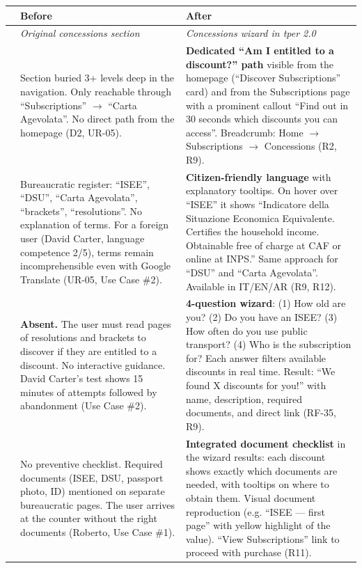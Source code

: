 \begin{table}[H]
\centering
\small
\renewcommand{\arraystretch}{1.4}
\begin{tabular}{|p{0.5cm}|p{7cm}|p{7cm}|}
\hline
& \textbf{Before} & \textbf{After} \\ \hline
\cellcolor{primaryColor!15} &
\textit{Original concessions section} &
\textit{Concessions wizard in tper 2.0} \\ \hline

\raisebox{0.5cm}{\rotatebox{90}{\textbf{Access}}} &
Section buried 3+ levels deep in the navigation. Only reachable through ``Subscriptions'' $\rightarrow$ ``Carta Agevolata''. No direct path from the homepage (D2, UR-05). &
\textbf{Dedicated ``Am I entitled to a discount?'' path} visible from the homepage (``Discover Subscriptions'' card) and from the Subscriptions page with a prominent callout ``Find out in 30 seconds which discounts you can access''. Breadcrumb: Home $\rightarrow$ Subscriptions $\rightarrow$ Concessions (R2, R9). \\ \hline

\raisebox{0.5cm}{\rotatebox{90}{\textbf{Language}}} &
Bureaucratic register: ``ISEE'', ``DSU'', ``Carta Agevolata'', ``brackets'', ``resolutions''. No explanation of terms. For a foreign user (David Carter, language competence 2/5), terms remain incomprehensible even with Google Translate (UR-05, Use Case \#2). &
\textbf{Citizen-friendly language} with explanatory tooltips. On hover over ``ISEE'' it shows ``Indicatore della Situazione Economica Equivalente. Certifies the household income. Obtainable free of charge at CAF or online at INPS.'' Same approach for ``DSU'' and ``Carta Agevolata''. Available in IT/EN/AR (R9, R12). \\ \hline

\raisebox{0.5cm}{\rotatebox{90}{\textbf{Wizard}}} &
\textbf{Absent.} The user must read pages of resolutions and brackets to discover if they are entitled to a discount. No interactive guidance. David Carter's test shows 15 minutes of attempts followed by abandonment (Use Case \#2). &
\textbf{4-question wizard}: (1) How old are you? (2) Do you have an ISEE? (3) How often do you use public transport? (4) Who is the subscription for? Each answer filters available discounts in real time. Result: ``We found X discounts for you!'' with name, description, required documents, and direct link (RF-35, R9). \\ \hline

\raisebox{0.5cm}{\rotatebox{90}{\textbf{Documents}}} &
No preventive checklist. Required documents (ISEE, DSU, passport photo, ID) mentioned on separate bureaucratic pages. The user arrives at the counter without the right documents (Roberto, Use Case \#1). &
\textbf{Integrated document checklist} in the wizard results: each discount shows exactly which documents are needed, with tooltips on where to obtain them. Visual document reproduction (e.g. ``ISEE --- first page'' with yellow highlight of the value). ``View Subscriptions'' link to proceed with purchase (R11). \\ \hline


\end{tabular}
\end{table}
